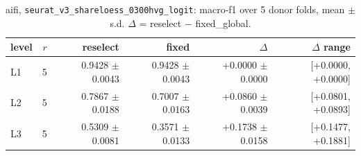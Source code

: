 \begin{table}[t]
\centering
\small
\begin{tabular}{lrrrrr}
\toprule
level & $r$ & reselect & fixed & $\Delta$ & $\Delta$ range \\
\midrule
L1 & 5 & 0.9428 $\pm$ 0.0043 & 0.9428 $\pm$ 0.0043 & +0.0000 $\pm$ 0.0000 & [+0.0000, +0.0000] \\
L2 & 5 & 0.7867 $\pm$ 0.0188 & 0.7007 $\pm$ 0.0163 & +0.0860 $\pm$ 0.0039 & [+0.0801, +0.0893] \\
L3 & 5 & 0.5309 $\pm$ 0.0081 & 0.3571 $\pm$ 0.0133 & +0.1738 $\pm$ 0.0158 & [+0.1477, +0.1881] \\
\bottomrule
\end{tabular}
\caption{aifi, \texttt{seurat\_v3\_shareloess\_0300hvg\_logit}: macro-f1 over 5 donor folds, mean $\pm$ s.d. $\Delta$ = reselect $-$ fixed\_global.}
\label{tab:cv-aifi-seurat-v3-shareloess-0300hvg-logit-macro_f1}
\end{table}